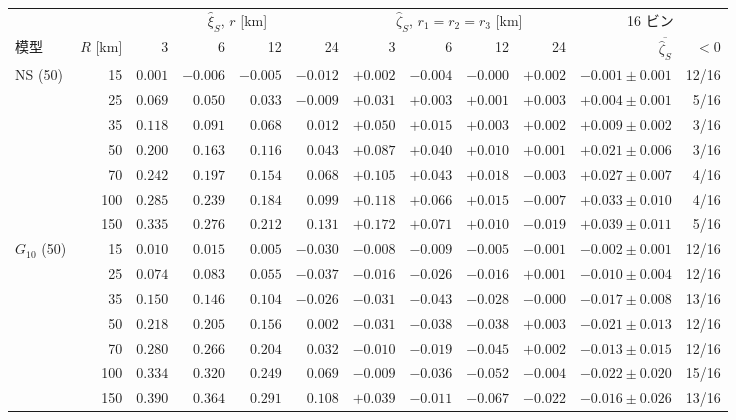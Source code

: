 \begin{tabular}{lrrrrrrrrrrr}
\toprule
& & \multicolumn{4}{c}{$\hat\xi_S$, $r$ [km]} & \multicolumn{4}{c}{$\hat\zeta_S$, $r_1 = r_2 = r_3$ [km]} & \multicolumn{2}{c}{16 ビン} \\
模型 & $R$ [km] & 3 & 6 & 12 & 24 & 3 & 6 & 12 & 24 & $\overline{\hat\zeta_S}$ & $< 0$ \\
\midrule
NS (50) & 15 & $0.001$ & $-0.006$ & $-0.005$ & $-0.012$ & $+0.002$ & $-0.004$ & $-0.000$ & $+0.002$ & $-0.001 \pm 0.001$ & 12/16 \\
 & 25 & $0.069$ & $0.050$ & $0.033$ & $-0.009$ & $+0.031$ & $+0.003$ & $+0.001$ & $+0.003$ & $+0.004 \pm 0.001$ & 5/16 \\
 & 35 & $0.118$ & $0.091$ & $0.068$ & $0.012$ & $+0.050$ & $+0.015$ & $+0.003$ & $+0.002$ & $+0.009 \pm 0.002$ & 3/16 \\
 & 50 & $0.200$ & $0.163$ & $0.116$ & $0.043$ & $+0.087$ & $+0.040$ & $+0.010$ & $+0.001$ & $+0.021 \pm 0.006$ & 3/16 \\
 & 70 & $0.242$ & $0.197$ & $0.154$ & $0.068$ & $+0.105$ & $+0.043$ & $+0.018$ & $-0.003$ & $+0.027 \pm 0.007$ & 4/16 \\
 & 100 & $0.285$ & $0.239$ & $0.184$ & $0.099$ & $+0.118$ & $+0.066$ & $+0.015$ & $-0.007$ & $+0.033 \pm 0.010$ & 4/16 \\
 & 150 & $0.335$ & $0.276$ & $0.212$ & $0.131$ & $+0.172$ & $+0.071$ & $+0.010$ & $-0.019$ & $+0.039 \pm 0.011$ & 5/16 \\
\midrule
$G_{10}$ (50) & 15 & $0.010$ & $0.015$ & $0.005$ & $-0.030$ & $-0.008$ & $-0.009$ & $-0.005$ & $-0.001$ & $-0.002 \pm 0.001$ & 12/16 \\
 & 25 & $0.074$ & $0.083$ & $0.055$ & $-0.037$ & $-0.016$ & $-0.026$ & $-0.016$ & $+0.001$ & $-0.010 \pm 0.004$ & 12/16 \\
 & 35 & $0.150$ & $0.146$ & $0.104$ & $-0.026$ & $-0.031$ & $-0.043$ & $-0.028$ & $-0.000$ & $-0.017 \pm 0.008$ & 13/16 \\
 & 50 & $0.218$ & $0.205$ & $0.156$ & $0.002$ & $-0.031$ & $-0.038$ & $-0.038$ & $+0.003$ & $-0.021 \pm 0.013$ & 12/16 \\
 & 70 & $0.280$ & $0.266$ & $0.204$ & $0.032$ & $-0.010$ & $-0.019$ & $-0.045$ & $+0.002$ & $-0.013 \pm 0.015$ & 12/16 \\
 & 100 & $0.334$ & $0.320$ & $0.249$ & $0.069$ & $-0.009$ & $-0.036$ & $-0.052$ & $-0.004$ & $-0.022 \pm 0.020$ & 15/16 \\
 & 150 & $0.390$ & $0.364$ & $0.291$ & $0.108$ & $+0.039$ & $-0.011$ & $-0.067$ & $-0.022$ & $-0.016 \pm 0.026$ & 13/16 \\

\end{tabular}
